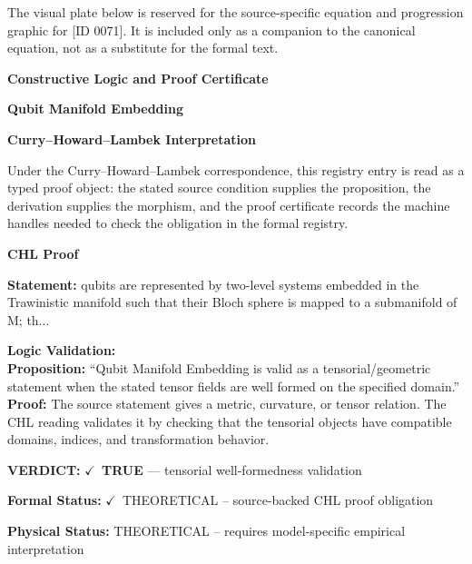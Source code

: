 \begingroup\footnotesize\sloppy
The visual plate below is reserved for the source-specific equation and progression graphic for [ID 0071]. It is included only as a companion to the canonical equation, not as a substitute for the formal text.
\par\endgroup
\ifTZPDarkEdition
{}
\fi

\clearpage
\begingroup\tzpsupportsetup
\noindent\textbf{\fontsize{10.8pt}{12.8pt}\selectfont [ID 0071] Constructive Logic and Proof Certificate}\par
\noindent\textbf{\fontsize{10pt}{12pt}\selectfont Qubit Manifold Embedding}\par
\vspace{0.45em}
\begingroup
\footnotesize
\setlength{\parskip}{0.22em}
\setlength{\parindent}{0pt}
\noindent\textbf{Curry--Howard--Lambek Interpretation}\par
Under the Curry--Howard--Lambek correspondence, this registry entry is read as a typed proof
object: the stated source condition supplies the proposition, the derivation supplies the
morphism, and the proof certificate records the machine handles needed to check the obligation
in the formal registry.

\vspace{0.45em}
\noindent\textbf{CHL Proof}\par
\textbf{Statement:} qubits are represented by two-level systems embedded in the Trawinistic manifold such
that their Bloch sphere is mapped to a submanifold of M; th...

\textbf{Logic Validation:}\\
\textbf{Proposition:} ``Qubit Manifold Embedding is valid as a tensorial/geometric statement when the stated
tensor fields are well formed on the specified domain.''\\
\textbf{Proof:} The source statement gives a metric, curvature, or tensor relation. The CHL reading
validates it by checking that the tensorial objects have compatible domains, indices,
and transformation behavior.

\textbf{VERDICT:} \ensuremath{\checkmark}\ \textbf{TRUE} --- tensorial well-formedness validation

\textbf{Formal Status:} \ensuremath{\checkmark}\ THEORETICAL -- source-backed CHL proof obligation

\textbf{Physical Status:} THEORETICAL -- requires model-specific empirical interpretation
\par\vspace{0.45em}
\par
\ifTZPDarkEdition
{}
\fi
\endgroup
\endgroup
